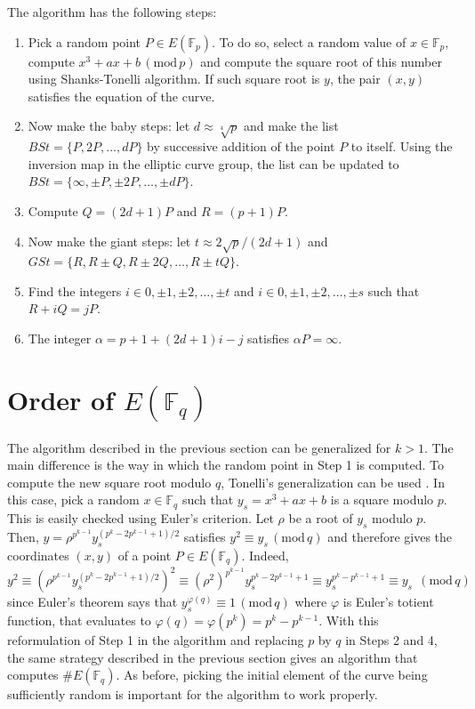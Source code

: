 \documentclass[letter,11pt,reqno]{article}
\theoremstyle{definition}
\theoremstyle{definition}
\theoremstyle{definition}
\theoremstyle{remark}
\theoremstyle{definition}
\theoremstyle{definition}
\newcommand{\Fp}{\mathbb{F}_p}
\newcommand{\Fq}{\mathbb{F}_q}
\newcommand{\modp}{\,(\text{mod}\, p)}
\newcommand{\modq}{\,(\text{mod}\, q)}
\begin{document}
The algorithm has the following steps:
\begin{enumerate}
    \item Pick a random point $P\in E(\Fp)$. To do so, select a random value of $x\in\Fp$, compute $x^3+ax+b \modp$ and compute the square root of this number using Shanks-Tonelli algorithm. If such square root is $y$, the pair $(x,y)$ satisfies the equation of the curve. 
    \item Now make the baby steps: let $d \approx \sqrt[4]{p}$ and make the list $BSt = \{ P,2P,\ldots,dP \}$ by successive addition of the point $P$ to itself. Using the inversion map in the elliptic curve group, the list can be updated to $BSt = \{ \infty,\pm P,\pm 2P,\ldots,\pm dP \}$. 
    \item Compute $Q = (2d+1)P$ and $R = (p+1)P$.
    \item Now make the giant steps: let $t \approx 2\sqrt{p}/(2d+1)$ and $GSt = \{ R,R\pm Q, R\pm 2Q, \ldots,R\pm tQ \}$. 
    \item Find the integers $i\in{0,\pm1,\pm2,\ldots,\pm t}$ and $i\in{0,\pm1,\pm2,\ldots,\pm s}$ such that $R+iQ = jP$. 
    \item The integer $\alpha = p+1+(2d+1)i-j$ satisfies $\alpha P = \infty$. 
\end{enumerate}

\section{Order of $E(\Fq)$}

The algorithm described in the previous section can be generalized for $k>1$. The main difference is the way in which the random point in Step 1 is computed. To compute the new square root modulo $q$, Tonelli's generalization can be used \cite{tonelli1891}. In this case, pick a random $x\in\Fq$ such that $y_s = x^3+ax+b$ is a square modulo $p$. This is easily checked using Euler's criterion. Let $\rho$ be a root of $y_s$ modulo $p$. Then, $y = \rho^{p^{k-1}}y_s^{(p^k-2p^{k-1}+1)/2}$ satisfies $y^2 \equiv y_s \modq$ and therefore gives the coordinates $(x,y)$ of a point $P\in E(\Fq)$. Indeed, $$y^2 \equiv \left( \rho^{p^{k-1}}y_s^{(p^k-2p^{k-1}+1)/2} \right)^2 \equiv (\rho^2)^{p^{k-1}}y_s^{p^k-2p^{k-1}+1} \equiv y_s^{p^{k}-p^{k-1}+1} \equiv y_s \;\modq$$ since Euler's theorem says that $y_s^{\varphi(q)} \equiv 1 \modq$ where $\varphi$ is Euler's totient function, that evaluates to $\varphi(q) = \varphi(p^k) = p^k-p^{k-1}.$ With this reformulation of Step 1 in the algorithm and replacing $p$ by $q$ in Steps 2 and 4, the same strategy described in the previous section gives an algorithm that computes $\# E(\Fq)$. As before, picking the initial element of the curve being sufficiently random is important for the algorithm to work properly.
\end{document}

